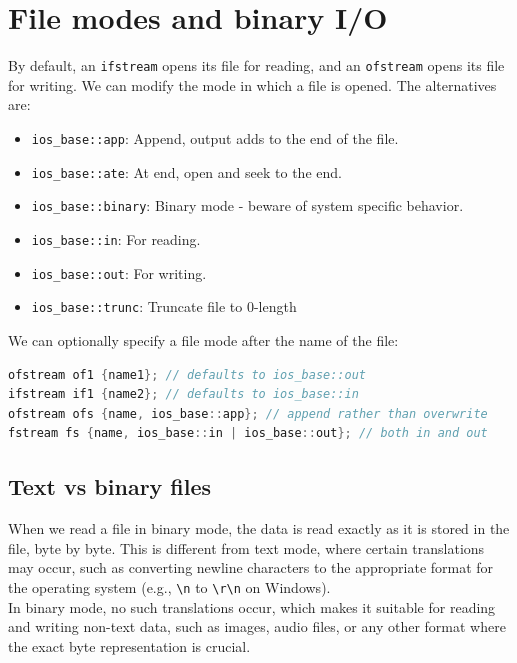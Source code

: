 \section{File modes and binary I/O}

By default, an \texttt{ifstream} opens its file for reading, and an \texttt{ofstream} opens
its file for writing. We can modify the mode in which a file is opened. The alternatives are:

\begin{itemize}
    \item \texttt{ios\_base::app}: Append, output adds to the end of the file.
    \item \texttt{ios\_base::ate}: At end, open and seek to the end.
    \item \texttt{ios\_base::binary}: Binary mode - beware of system specific behavior.
    \item \texttt{ios\_base::in}: For reading.
    \item \texttt{ios\_base::out}: For writing.
    \item \texttt{ios\_base::trunc}: Truncate file to 0-length
\end{itemize}

We can optionally specify a file mode after the name of the file:\\

\begin{lstlisting}[language=C++]
ofstream of1 {name1}; // defaults to ios_base::out
ifstream if1 {name2}; // defaults to ios_base::in
ofstream ofs {name, ios_base::app}; // append rather than overwrite
fstream fs {name, ios_base::in | ios_base::out}; // both in and out
\end{lstlisting}

\subsection{Text vs binary files}

When we read a file in binary mode, the data is read exactly as it is stored in the file, 
byte by byte. This is different from text mode, where certain translations may occur, such 
as converting newline characters to the appropriate format for the operating system (e.g., 
\verb|\n| to \verb|\r\n| on Windows).\\

In binary mode, no such translations occur, which makes it suitable for reading and writing 
non-text data, such as images, audio files, or any other format where the exact byte 
representation is crucial.

